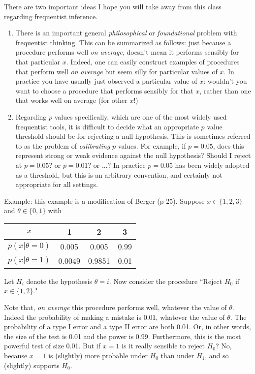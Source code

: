 \documentclass[times,11pt]{article}
\def\data{x}
\begin{document}
There are two important ideas I hope you will take away from this class regarding frequentist inference. 
\begin{enumerate}
\item There is an important general {\it philosophical} or {\it foundational} problem with frequentist thinking. This can be summarized as follows: just because
a procedure performs well {\it on average}, doesn't mean it performs sensibly for that particular $\data$.  Indeed,  one can easily construct examples of procedures that perform well {\it on average}
but seem silly for particular values of $\data$.
In practice
you have usually just observed a particular value of $\data$: wouldn't you want to choose a procedure that performs sensibly for that $\data$, rather than one that works well on average (for other $\data$!)
\item Regarding $p$ values specifically, which
are one of the most widely used frequentist tools,
it is difficult to decide what an appropriate $p$ value threshold should be for rejecting a null hypothesis. This is sometimes referred to as the problem of {\it calibrating} $p$ values. For example, if $p=0.05$, does this represent strong or weak evidence against the null hypothesis? Should I reject at $p=0.05$? or $p=0.01$? or ...?
In practice $p=0.05$ has been widely adopted as
a threshold, but this is an arbitrary convention, and certainly not appropriate for all settings.
\end{enumerate}


Example: this example is a modification of Berger (p 25). Suppose $\data \in \{1,2,3\}$ and $\theta \in \{0,1\}$
with 
\begin{table}[h!]
\center
\begin{tabular}{c|c|c|c}
$\data$ & 1 & 2 & 3 \\ \hline
$p(\data|\theta=0)$ & 0.005 & 0.005 & 0.99 \\
$p(\data|\theta=1)$ & 0.0049 & 0.9851 & 0.01 
\end{tabular}
\end{table}

Let $H_i$ denote the hypothesis $\theta=i$.
Now consider the procedure ``Reject $H_0$ if $\data \in \{1,2\}$."

Note that, {\it on average} this procedure performs
well, whatever the value of $\theta$. Indeed
the probability of making a mistake is 0.01,
whatever the value of $\theta$. The probability of a type I error and a type II error are both 0.01.
Or, in other words, the size of the test is 0.01 and the power is 0.99.
Furthermore, this is the most powerful test of size 0.01. But
if $\data=1$ is it really sensible to reject $H_0$? No, because $\data=1$ is (slightly) more probable under $H_0$ than under $H_1$, and so (slightly) supports $H_0$. 
\end{document}
